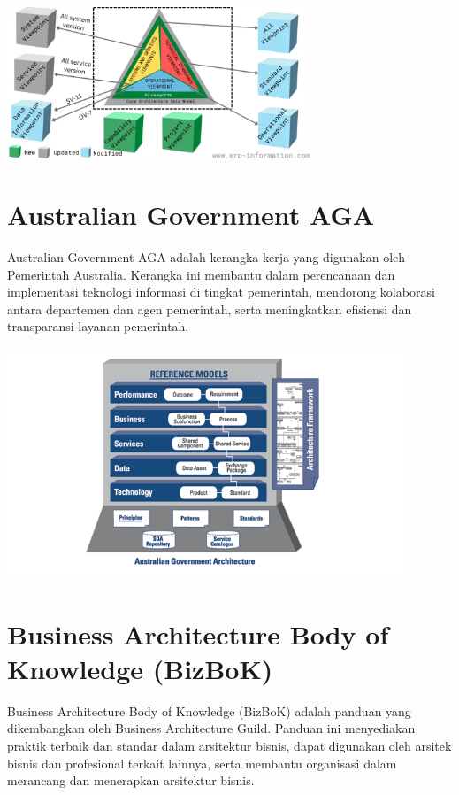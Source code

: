 \begin{center}
	\includegraphics[width=0.68\textwidth]{../figures/dodaf}
\end{center}

\section{Australian Government AGA}
Australian Government AGA adalah kerangka kerja yang digunakan oleh Pemerintah Australia. Kerangka ini membantu dalam perencanaan dan implementasi teknologi informasi di tingkat pemerintah, mendorong kolaborasi antara departemen dan agen pemerintah, serta meningkatkan efisiensi dan transparansi layanan pemerintah.

\begin{center}
	\includegraphics[width=0.9\textwidth]{../figures/aga}
\end{center}

\section{Business Architecture Body of Knowledge (BizBoK)}
Business Architecture Body of Knowledge (BizBoK) adalah panduan yang dikembangkan oleh Business Architecture Guild. Panduan ini menyediakan praktik terbaik dan standar dalam arsitektur bisnis, dapat digunakan oleh arsitek bisnis dan profesional terkait lainnya, serta membantu organisasi dalam merancang dan menerapkan arsitektur bisnis.

